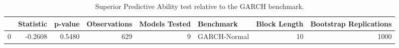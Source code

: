\begin{table}
\caption{Superior Predictive Ability test relative to the GARCH benchmark.}
\label{tab:spa_test_results}
\begin{tabular}{lrrrrlrr}
\toprule
 & Statistic & p-value & Observations & Models Tested & Benchmark & Block Length & Bootstrap Replications \\
\midrule
0 & -0.2608 & 0.5480 & 629 & 9 & GARCH-Normal & 10 & 1000 \\
\bottomrule
\end{tabular}
\end{table}
